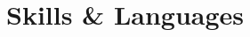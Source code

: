 \documentclass[10pt]{article}
\begin{document}



\newcommand{\skills}[2]{
  \item #2 #1
}

\vspace{-1em}

\section{Skills \& Languages}

\vspace{-1em}
\end{document}
